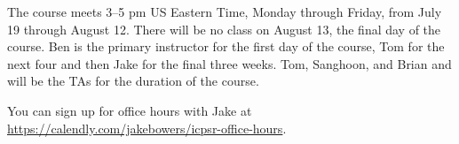 The course meets 3--5 pm US Eastern Time, Monday through Friday, from July 19 through August
12. There will be no class on August 13, the final day of the course.  Ben is
the primary instructor for the first day of the course, Tom for the next four
and then Jake for the final three weeks. Tom,  Sanghoon, and Brian and will be
the TAs for the duration of the course.

You can sign up for office hours with Jake at \href{Calendly}{https://calendly.com/jakebowers/icpsr-office-hours}.


